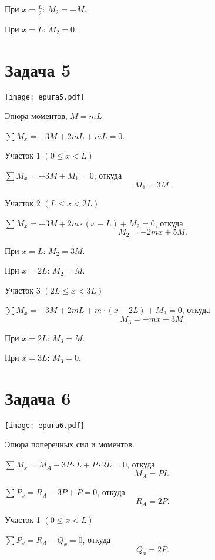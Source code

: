 При $x = \frac{L}{2}$: $M_2 = -M$.

При $x = L$: $M_2 = 0$.

\newpage


\section{Задача 5}

\begin{floatingfigure}[r]{0.5\textwidth}
    \centering
    \texttt{[image: epura5.pdf]}
    \caption{Эпюра моментов, $M = mL$.}
    \label{fig:chap1-epura5}
\end{floatingfigure}

$\sum M_x = -3M + 2mL + mL = 0$.

Участок 1 $\left(0 \le x < L\right)$

$\sum M_x = -3M + M_1 = 0$,
откуда
\[
    M_1 = 3M.
\]

Участок 2 $\left(L \le x < 2L\right) $

$\sum M_x = -3M + 2m \cdot \left(x- L\right) + M_2 =  0$,
откуда
\[
    M_2 = -2mx + 5M.
\]

При $x = L$: $M_2 = 3M$.

При $x = 2L$: $M_2 = M$.

Участок 3 $\left(2L \le x < 3L\right)$

$\sum M_x = -3M + 2mL + m \cdot \left(x- 2L\right) + M_3 = 0$,
откуда
\[
    M_3 = -mx + 3M.
\]

При $x = 2L$: $M_3 = M$.

При $x = 3L$: $M_3 = 0$.

\newpage


\section{Задача 6}

\begin{floatingfigure}[r]{0.5\textwidth}
    \centering
    \texttt{[image: epura6.pdf]}
    \caption{Эпюра поперечных сил и моментов.}
    \label{fig:chap1-epura6}
\end{floatingfigure}

$\sum M_x = M_A - 3P \cdot L + P \cdot 2L = 0$,
откуда
\[
    M_A = PL.
\]

$\sum P_x = R_A - 3P + P = 0$,
откуда
\[
    R_A = 2P.
\]

Участок 1 $\left(0 \le x < L\right)$

$\sum P_x = R_A - Q_x = 0$,
откуда
\[
    Q_x = 2P.
\]

